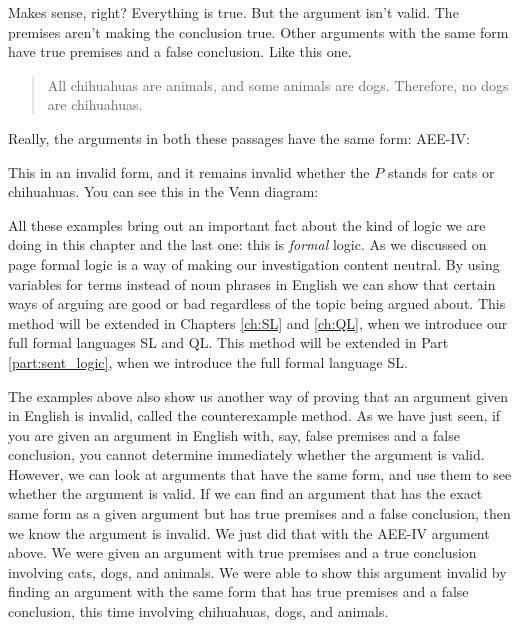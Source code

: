 Makes sense, right? Everything is true. But the argument isn't valid. The premises aren't making the conclusion true. Other arguments with the same form have true premises and a false conclusion. Like this one.

\begin{quotation}All chihuahuas are animals, and some animals are dogs. Therefore, no dogs are chihuahuas.\end{quotation}

Really, the arguments in both these passages have the same form: AEE-IV:

\begin{kormanize}
\end{kormanize}

This in an invalid form, and it remains invalid whether the $P$ stands for cats or chihuahuas. You can see this in the Venn diagram:



All these examples bring out an important fact about the kind of logic we are doing in this chapter and the last one: this is \emph{formal} logic. As we discussed on page \pageref{def:Formal_logic} formal logic is a way of making our investigation content neutral. By using variables for terms instead of noun phrases in English we can show that certain ways of arguing are good or bad regardless of the topic being argued about. This method will be extended in Chapters \ref{ch:SL} and \ref{ch:QL}, when we introduce our full formal languages SL and QL.
This method will be extended in Part \ref{part:sent_logic}, when we introduce the full formal language SL.


The examples above also show us another way of proving that an argument given in English is invalid, called the counterexample method. As we have just seen, if you are given an argument in English with, say, false premises and a false conclusion, you cannot determine immediately whether the argument is valid. However, we can look at arguments that have the same form, and use them to see whether the argument is valid. If we can find an argument that has the exact same form as a given argument but has true premises and a false conclusion, then we know the argument is invalid. We just did that with the AEE-IV argument above. We were given an argument with true premises and a true conclusion involving cats, dogs, and animals. We were able to show this argument invalid by finding an argument with the same form that has true premises and a false conclusion, this time involving chihuahuas, dogs, and animals.


